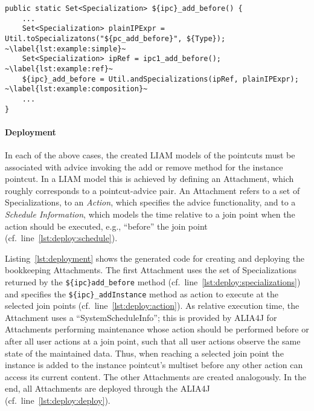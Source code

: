 \begin{lstlisting}[caption={Generated code for creating the LIAM model for the add/before pointcut of the instance pointcut created with expression refinement},label={lst:example:exprRef}]
public static Set<Specialization> ${ipc}_add_before() {
	...
	Set<Specialization> plainIPExpr = Util.toSpecializatons("${pc_add_before}", ${Type}); ~\label{lst:example:simple}~
	Set<Specialization> ipRef = ipc1_add_before(); ~\label{lst:example:ref}~
	${ipc}_add_before = Util.andSpecializations(ipRef, plainIPExpr); ~\label{lst:example:composition}~
	...
}
\end{lstlisting}

\paragraph{Deployment}

In each of the above cases, the created LIAM models of the pointcuts must be associated with advice invoking the add or remove method for the instance pointcut.
In a LIAM model this is achieved by defining an Attachment, which roughly corresponds to a pointcut-advice pair.
An Attachment refers to a set of Specializations, to an \emph{Action}, which specifies the advice functionality, and to a \emph{Schedule Information}, which models the time relative to a join point when the action should be executed, e.g., ``before'' the join point (cf.\ line~\ref{lst:deploy:schedule}).

Listing~\ref{lst:deployment} shows the generated code for creating and deploying the bookkeeping Attachments.
The first Attachment uses the set of Specializations returned by the \lstinline!${ipc}add_before! method (cf.\ line~\ref{lst:deploy:specializations}) and specifies the \lstinline!${ipc}_addInstance! method as action to execute at the selected join points (cf.\ line~\ref{lst:deploy:action}).
As relative execution time, the Attachment uses a ``SystemScheduleInfo''; this is provided by ALIA4J for Attachments performing maintenance whose action should be performed before or after all user actions at a join point, such that all user actions observe the same state of the maintained data.
Thus, when reaching a selected join point the instance is added to the instance pointcut's multiset before any other action can access its current content.
The other Attachments are created analogously.
In the end, all Attachments are deployed through the ALIA4J  (cf.\ line~\ref{lst:deploy:deploy}).

